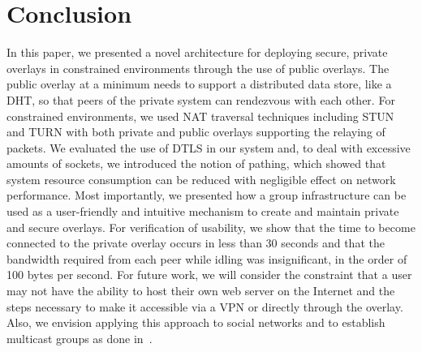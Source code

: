 \documentclass[conference]{IEEEtran}
\begin{document}
\section{Conclusion}
\label{conclusions}
In this paper, we presented a novel architecture for deploying secure, private
overlays in constrained environments through the use of public overlays.
The public overlay at a minimum needs to support a distributed data store,
like a DHT, so that peers of the private system can rendezvous with each other.
For constrained environments, we used NAT traversal techniques including STUN and
TURN with both private and public overlays supporting the relaying of packets.
We evaluated the use of DTLS in our system and, to deal with excessive amounts of
sockets, we introduced the notion of pathing, which showed that system resource
consumption can be reduced with negligible effect on network performance.  Most
importantly, we presented how a group infrastructure can be used as a user-friendly
and intuitive mechanism to create and maintain private and secure overlays.  
For verification of usability, we show that the time to become connected to the
private overlay occurs in less than 30 seconds and that the bandwidth required 
from each peer while idling was insignificant, in the order of 100 bytes per
second.  For future work, we will consider the constraint that a user may not have
the ability to host their own web server on the Internet and the steps necessary
to make it accessible via a VPN or directly through the overlay.  Also, we
envision applying this approach to social networks and to establish multicast
groups as done in~\cite{can}.



\suppressfloats
\end{document}
